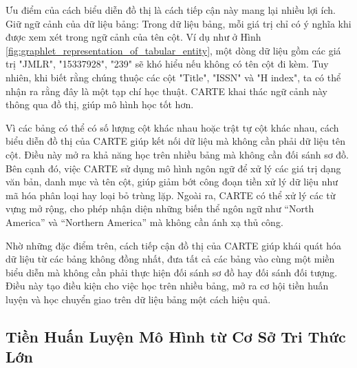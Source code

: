 \documentclass{article}
\begin{document}
Ưu điểm của cách biểu diễn đồ thị là cách tiếp cận này mang lại nhiều lợi ích. Giữ ngữ cảnh của dữ liệu bảng: Trong dữ liệu bảng, mỗi giá trị chỉ có ý nghĩa khi được xem xét trong ngữ cảnh của tên cột. Ví dụ như ở Hình \ref{fig:graphlet_representation_of_tabular_entity}, một dòng dữ liệu gồm các giá trị "JMLR", "15337928", "239" sẽ khó hiểu nếu không có tên cột đi kèm. Tuy nhiên, khi biết rằng chúng thuộc các cột "Title", "ISSN" và "H index", ta có thể nhận ra rằng đây là một tạp chí học thuật. CARTE khai thác ngữ cảnh này thông qua đồ thị, giúp mô hình học tốt hơn.

Vì các bảng có thể có số lượng cột khác nhau hoặc trật tự cột khác nhau, cách biểu diễn đồ thị của CARTE giúp kết nối dữ liệu mà không cần phải dữ liệu tên cột. Điều này mở ra khả năng học trên nhiều bảng mà không cần đối sánh sơ đồ. Bên cạnh đó, việc CARTE sử dụng mô hình ngôn ngữ để xử lý các giá trị dạng văn bản, danh mục và tên cột, giúp giảm bớt công đoạn tiền xử lý dữ liệu như mã hóa phân loại hay loại bỏ trùng lặp. Ngoài ra, CARTE có thể xử lý các từ vựng mở rộng, cho phép nhận diện những biến thể ngôn ngữ như “North America” và “Northern America” mà không cần ánh xạ thủ công.

Nhờ những đặc điểm trên, cách tiếp cận đồ thị của CARTE giúp khái quát hóa dữ liệu từ các bảng không đồng nhất, đưa tất cả các bảng vào cùng một miền biểu diễn mà không cần phải thực hiện đối sánh sơ đồ hay đối sánh đối tượng. Điều này tạo điều kiện cho việc học trên nhiều bảng, mở ra cơ hội tiền huấn luyện và học chuyển giao trên dữ liệu bảng một cách hiệu quả.


\subsection{Tiền Huấn Luyện Mô Hình từ Cơ Sở Tri Thức Lớn}
\end{document}
